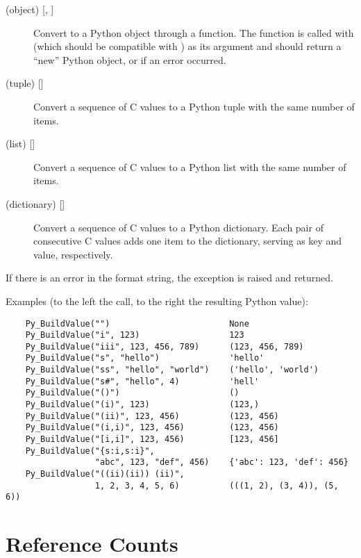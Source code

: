 \begin{description}
\item[ (object) {[, ]}]
Convert  to a Python object through a 
function.  The function is called with  (which should be
compatible with ) as its argument and should return a
``new'' Python object, or  if an error occurred.

\item[ (tuple) {[]}]
Convert a sequence of C values to a Python tuple with the same number
of items.

\item[ (list) {[]}]
Convert a sequence of C values to a Python list with the same number
of items.

\item[ (dictionary) {[]}]
Convert a sequence of C values to a Python dictionary.  Each pair of
consecutive C values adds one item to the dictionary, serving as key
and value, respectively.

\end{description}

If there is an error in the format string, the
 exception is raised and  returned.

Examples (to the left the call, to the right the resulting Python value):

\begin{verbatim}
    Py_BuildValue("")                        None
    Py_BuildValue("i", 123)                  123
    Py_BuildValue("iii", 123, 456, 789)      (123, 456, 789)
    Py_BuildValue("s", "hello")              'hello'
    Py_BuildValue("ss", "hello", "world")    ('hello', 'world')
    Py_BuildValue("s#", "hello", 4)          'hell'
    Py_BuildValue("()")                      ()
    Py_BuildValue("(i)", 123)                (123,)
    Py_BuildValue("(ii)", 123, 456)          (123, 456)
    Py_BuildValue("(i,i)", 123, 456)         (123, 456)
    Py_BuildValue("[i,i]", 123, 456)         [123, 456]
    Py_BuildValue("{s:i,s:i}",
                  "abc", 123, "def", 456)    {'abc': 123, 'def': 456}
    Py_BuildValue("((ii)(ii)) (ii)",
                  1, 2, 3, 4, 5, 6)          (((1, 2), (3, 4)), (5, 6))
\end{verbatim}


\section{Reference Counts}

